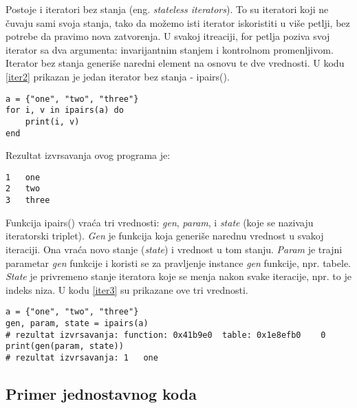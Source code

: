 \documentclass[a4paper]{article}
\begin{document}
Postoje i iteratori bez stanja (eng. \textit{stateless iterators}). To su iteratori koji ne čuvaju sami svoja stanja, tako da možemo isti iterator iskoristiti u više petlji, bez potrebe da pravimo nova zatvorenja. U svakoj itreaciji, for petlja poziva svoj iterator sa dva argumenta: invarijantnim stanjem i kontrolnom promenljivom. Iterator bez stanja generiše naredni element na osnovu te dve vrednosti. U kodu \ref{iter2} prikazan je jedan iterator bez stanja - ipairs()\cite{bookProgInLua}.

\begin{lstlisting}[caption={Primer iteratora bez stanja},frame=single, label=iter2]
a = {"one", "two", "three"}
for i, v in ipairs(a) do
	print(i, v)
end
\end{lstlisting}
Rezultat izvrsavanja ovog programa je:
\begin{verbatim}
1	one
2	two
3	three
\end{verbatim}
Funkcija ipairs() vraća tri vrednosti: \textit{gen}, \textit{param}, i \textit{state} (koje se nazivaju iteratorski triplet). \textit{Gen} je funkcija koja generiše narednu vrednost u svakoj iteraciji. Ona vraća novo stanje (\textit{state}) i vrednost u tom stanju. \textit{Param} je trajni parametar \textit{gen} funkcije i koristi se za pravljenje instance \textit{gen} funkcije, npr. tabele. \textit{State} je privremeno stanje iteratora koje se menja nakon svake iteracije, npr. to je indeks niza\cite{luafun}. U kodu \ref{iter3} su prikazane ove tri vrednosti.
\begin{lstlisting}[caption={Primer iteratora bez stanja (nastavak)},frame=single, label=iter3]
a = {"one", "two", "three"}
gen, param, state = ipairs(a)
# rezultat izvrsavanja: function: 0x41b9e0	table: 0x1e8efb0	0
print(gen(param, state))
# rezultat izvrsavanja: 1	one
\end{lstlisting}


\subsection{Primer jednostavnog koda}
\label{sec:primer_koda}
\end{document}
